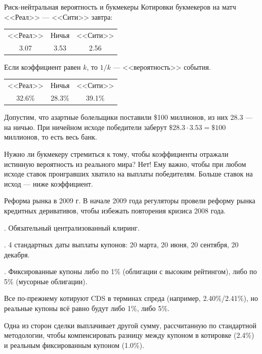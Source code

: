 \documentclass{beamer}
\begin{document}
\begin{frame}{Риск-нейтральная вероятность и букмекеры}
\justify
Котировки букмекеров на матч <<Реал>> --- <<Сити>> завтра:

\centering
\begin{tabular}{c|c|c}
<<Реал>> & Ничья & <<Сити>> \\
3.07 & 3.53 & 2.56
\end{tabular}

\justify
Если коэффициент равен $k$, то $1/k$ --- <<вероятность>> события.

\centering
\begin{tabular}{c|c|c}
<<Реал>> & Ничья & <<Сити>> \\
32.6\% & 28.3\% & 39.1\%
\end{tabular}

\justify
Допустим, что азартные болельщики поставили \$100 миллионов, из них 28.3 --- на ничью. При 
ничейном исходе победители заберут $\$28.3 \cdot 3.53 = \$100$ миллионов, то 
есть весь банк.

\justify
Нужно ли букмекеру стремиться к тому, чтобы коэффициенты отражали истинную вероятность из реального мира? Нет! Ему важно, чтобы при любом исходе ставок проигравших хватило на выплаты победителям. Больше ставок на исход --- ниже коэффициент.
\end{frame}



\begin{frame}{Реформа рынка в 2009 г.}
\justify
В начале 2009 года регуляторы провели реформу рынка кредитных деривативов, чтобы избежать повторения кризиса 2008 года.

. Обязательный централизованный клиринг.

. 4 стандартных даты выплаты купонов: 20 марта, 20 июня, 20 сентября, 20 декабря.

. Фиксированные купоны либо по 1\% (облигации с высоким рейтингом), либо по 5\% (мусорные облигации).

\justify
Все по-прежнему котируют CDS в терминах спреда (например, 2.40\%/2.41\%), но реальные купоны всё равно будут либо 1\%, либо 5\%.

\justify
Одна из сторон сделки выплачивает другой сумму, рассчитанную по стандартной методологии, чтобы компенсировать разницу между купоном в котировке (2.4\%) и реальным фиксированным купоном (1.0\%).
\end{frame}
\end{document}
